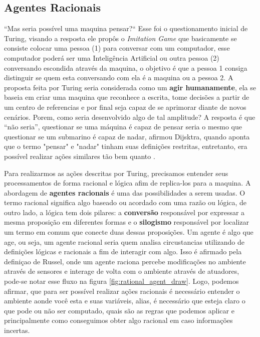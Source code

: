 \subsection{Agentes Racionais}
“Mas seria possível uma maquina pensar?“ Esse foi o questionamento inicial de Turing, visando a resposta ele propôs o \textit{Imitation Game} que basicamente se consiste colocar uma pessoa (1) para conversar com um computador, esse computador poderá ser uma Inteligência Artificial ou outra pessoa (2) conversando escondida através da maquina, o objetivo é que a pessoa 1 consiga distinguir se quem esta conversando com ela é a maquina ou a pessoa 2. A proposta feita por Turing seria considerada como um \textbf{agir humanamente}, ela se baseia em criar uma maquina que reconhece a escrita, tome decisões a partir de um centro de referencias e por final seja capaz de se aprimorar diante de novos cenários. Porem, como seria desenvolvido algo de tal amplitude? A resposta é que “não seria”, questionar se uma máquina é capaz de pensar seria o mesmo que questionar se um submarino é capaz de nadar, afirmou Dijsktra, quando aponta que o termo "pensar" e "nadar" tinham suas definições restritas, entretanto, era possível realizar ações similares tão bem quanto \cite[2-3]{dijkstra898, turing1950, russell2003artificial}.

Para realizarmos as ações descritas por Turing, precisamos entender seus processamentos de forma racional e lógica afim de replica-los para a maquina. A abordagem de \textbf{agentes racionais} é uma das possibilidades a serem usadas. O termo racional significa algo baseado ou acordado com uma razão ou lógica, de outro lado, a lógica tem dois pilares: a \textbf{conversão} responsável por expressar a mesma proposição em diferentes formas e o \textbf{silogismo} responsável por localizar um termo em comum que conecte duas dessas proposições. Um agente é algo que age, ou seja, um agente racional seria quem analisa circustancias utilizando de definições lógicas e racionais a fim de interagir com algo. Isso é afirmado pela definiçao de Russel, onde um agente raciona percebe modificações no ambiente através de sensores e interage de volta com o ambiente através de atuadores, pode-se notar esse fluxo na figura \ref{fig:rational_agent_draw}. Logo, podemos afirmar, que para ser possível realizar ações racionais é necessário entender o ambiente aonde você esta e suas variáveis, alias, é necessário que esteja claro o que pode ou não ser computado, quais são as regras que podemos aplicar e principalmente como conseguimos obter algo racional em caso informações incertas. \cite[7]{frege1956thought, wooldridge1994agent, simon1955behavioral, boole1854investigation, russell2003artificial}

